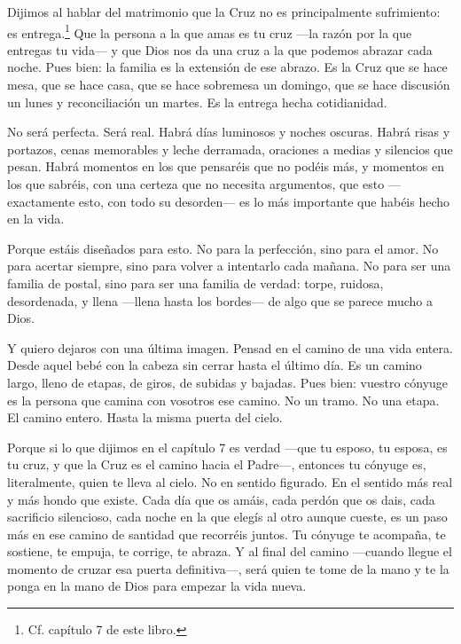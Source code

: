 \medskip

Dijimos al hablar del matrimonio que la Cruz no es principalmente sufrimiento: es entrega.\footnote{Cf. capítulo 7 de este libro.} Que la persona a la que amas es tu cruz ---la razón por la que entregas tu vida--- y que Dios nos da una cruz a la que podemos abrazar cada noche. Pues bien: la familia es la extensión de ese abrazo. Es la Cruz que se hace mesa, que se hace casa, que se hace sobremesa un domingo, que se hace discusión un lunes y reconciliación un martes. Es la entrega hecha cotidianidad.

No será perfecta. Será real. Habrá días luminosos y noches oscuras. Habrá risas y portazos, cenas memorables y leche derramada, oraciones a medias y silencios que pesan. Habrá momentos en los que pensaréis que no podéis más, y momentos en los que sabréis, con una certeza que no necesita argumentos, que esto ---exactamente esto, con todo su desorden--- es lo más importante que habéis hecho en la vida.

Porque estáis diseñados para esto. No para la perfección, sino para el amor. No para acertar siempre, sino para volver a intentarlo cada mañana. No para ser una familia de postal, sino para ser una familia de verdad: torpe, ruidosa, desordenada, y llena ---llena hasta los bordes--- de algo que se parece mucho a Dios.

\medskip

Y quiero dejaros con una última imagen. Pensad en el camino de una vida entera. Desde aquel bebé con la cabeza sin cerrar hasta el último día. Es un camino largo, lleno de etapas, de giros, de subidas y bajadas. Pues bien: vuestro cónyuge es la persona que camina con vosotros ese camino. No un tramo. No una etapa. El camino entero. Hasta la misma puerta del cielo.

Porque si lo que dijimos en el capítulo 7 es verdad ---que tu esposo, tu esposa, es tu cruz, y que la Cruz es el camino hacia el Padre---, entonces tu cónyuge es, literalmente, quien te lleva al cielo. No en sentido figurado. En el sentido más real y más hondo que existe. Cada día que os amáis, cada perdón que os dais, cada sacrificio silencioso, cada noche en la que elegís al otro aunque cueste, es un paso más en ese camino de santidad que recorréis juntos. Tu cónyuge te acompaña, te sostiene, te empuja, te corrige, te abraza. Y al final del camino ---cuando llegue el momento de cruzar esa puerta definitiva---, será quien te tome de la mano y te la ponga en la mano de Dios para empezar la vida nueva.

